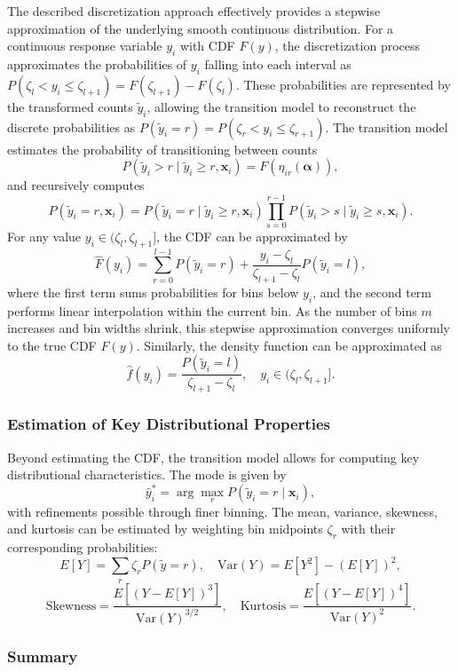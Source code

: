 \documentclass[english,a4paper,11pt]{article}
\begin{document}
The described discretization approach effectively provides a stepwise approximation of the
underlying smooth continuous distribution. For a continuous response variable $y_i$ with CDF $F(y)$,
the discretization process approximates the
probabilities of $y_i$ falling into each interval as
$P(\zeta_l < y_i \leq \zeta_{l+1}) = F(\zeta_{l+1}) - F(\zeta_l)$.
These probabilities are represented by the transformed counts $\tilde{y}_i$, allowing the
transition model to reconstruct the discrete probabilities as
$P(\tilde{y}_i = r) = P(\zeta_r < y_i \leq \zeta_{r+1})$.
The transition model estimates the probability of transitioning between counts
$$
P(\tilde{y}_i > r \mid \tilde{y}_i \geq r, \mathbf{x}_i) = F(\eta_{ir}(\boldsymbol{\alpha})),
$$
and recursively computes
$$
P(\tilde{y}_i = r, \mathbf{x}_i) = P(\tilde{y}_i = r \mid \tilde{y}_i \geq r, \mathbf{x}_i) \prod_{s=0}^{r-1} P(\tilde{y}_i > s \mid \tilde{y}_i \geq s, \mathbf{x}_i).
$$
For any value $y_i \in (\zeta_l, \zeta_{l+1}]$, the CDF can be approximated by
$$
\hat{F}(y_i) = \sum_{r=0}^{l-1} P(\tilde{y}_i = r) + \frac{y_i - \zeta_l}{\zeta_{l+1} - \zeta_l} P(\tilde{y}_i = l),
$$
where the first term sums probabilities for bins below $y_i$, and the second term performs
linear interpolation within the current bin. As the number of bins $m$ increases and bin
widths shrink, this stepwise approximation converges uniformly to the true CDF $F(y)$.
Similarly, the density function can be approximated as
$$
\hat{f}(y_i) = \frac{P(\tilde{y}_i = l)}{\zeta_{l+1} - \zeta_l}, \quad y_i \in (\zeta_l, \zeta_{l+1}].
$$

\subsubsection{Estimation of Key Distributional Properties}

Beyond estimating the CDF, the transition model allows for computing key
distributional characteristics. The mode is given by
$$
\hat{y}_i^* = \arg\max_r P(\tilde{y}_i = r \mid \mathbf{x}_i),
$$
with refinements possible through finer binning. The mean, variance, skewness, and kurtosis
can be estimated by weighting bin midpoints $\zeta_r$ with their corresponding probabilities:
$$
E[Y] = \sum_{r} \zeta_r P(\tilde{y} = r), \quad \text{Var}(Y) = E[Y^2] - (E[Y])^2,
$$
$$
\text{Skewness} = \frac{E[(Y - E[Y])^3]}{\text{Var}(Y)^{3/2}}, \quad \text{Kurtosis} = \frac{E[(Y - E[Y])^4]}{\text{Var}(Y)^2}.
$$

\subsubsection{Summary}
\end{document}

